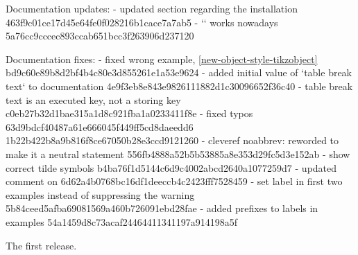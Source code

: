 \begin{changelog}
Documentation updates:
- updated section regarding the installation
  \commit 463f9c01ce17d45e64fe0f028216b1cace7a7ab5
- `` works nowadays
  \commit 5a76cc9cccec893ccab651bcc3f263906d237120

Documentation fixes:
- fixed wrong example, \cref{new-object-style-tikzobject}
  \commit bd9c60e89b8d2bf4b4c80e3d855261e1a53e9624
- added initial value of `table break text` to documentation
  \commit 4e9f3eb8e843e9826111882d1c30096652f36c40
- table break text is an executed key, not a storing key
  \commit c0eb27b32d1bae315a1d8c921fba1a0233411f8e
- fixed typos
  \commit 63d9bdcf40487a61e666045f449ff5cd8daeedd6
  \commit 1b22b422b8a9b816f8ce67050b28e3ccd9121260
- cleveref noabbrev: reworded to make it a neutral statement
  \commit 556fb4888a52b5b53885a8e353d29fc5d3e152ab
- show correct tilde symbols
  \commit b4ba76f1d5144c6d9c4002abcd2640a1077259d7
- updated comment on 
  \commit 6d62a4b0768bc16df1deeccb4c2423fff7528459
- set label in first two examples instead of suppressing the warning
  \commit 5b84ceed5afba69081569a460b726091ebd28fae
- added prefixes to labels in examples
  \commit 54a1459d8c73acaf24464411341197a914198a5f

The first release.
\end{changelog}
